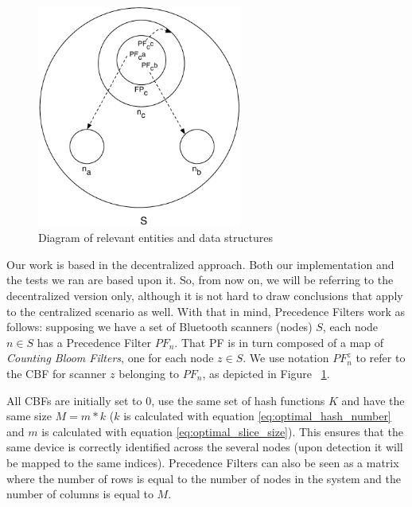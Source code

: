 \begin{figure}
  \centering
  \includegraphics[width=0.60\textwidth]{images/precedence_filters.pdf}
  \caption{Diagram of relevant entities and data structures}
  \label{fig:precedence_filters}
\end{figure}

Our work is based in the decentralized approach. Both our
implementation and the tests we ran are based upon it. So,
from now on, we will be referring to the decentralized version only,
although it is not hard to draw conclusions that apply to the
centralized scenario as well.
With that in mind, Precedence Filters work as follows: supposing we
have a set of Bluetooth scanners (nodes) $S$, each node $n \in S$ has
a Precedence Filter $PF_n$. That PF is in turn composed of a map of
\emph{Counting Bloom Filters}, one for each node $z \in S$. We use
notation $PF_n^z$ to refer to the CBF for scanner $z$ belonging to
$PF_n$, as depicted in Figure ~\ref{fig:precedence_filters}.

All CBFs are initially set to 0, use the same set of hash functions
$K$ and have the same size $M = m * k$ ($k$ is calculated with
equation \ref{eq:optimal_hash_number} and $m$ is calculated with
equation \ref{eq:optimal_slice_size}). This ensures that the same
device is correctly identified across the several nodes (upon
detection it will be mapped to the same indices). Precedence Filters
can also be seen as a matrix where the number of rows is equal to the
number of nodes in the system and the number of columns is equal to $M$.

